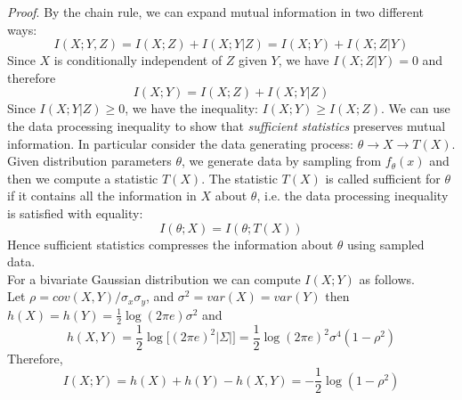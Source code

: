 \textit{Proof}. By the chain rule, we can expand mutual information in two different ways:
\begin{equation}
    I(X;Y,Z) = I(X;Z) + I(X;Y|Z) = I(X;Y) + I(X;Z|Y)
\end{equation}
Since $X$ is conditionally independent of $Z$ given $Y$, we have $I(X;Z|Y) = 0$ and therefore
\begin{equation}
    I(X;Y) = I(X;Z) + I(X;Y|Z)
\end{equation}
Since $I(X;Y|Z) \geq 0$, we have the inequality: $I(X;Y)\geq I(X;Z)$.
We can use the data processing inequality to show that \textit{sufficient statistics} preserves mutual information. In particular consider the data generating process: $\theta \rightarrow X \rightarrow T(X)$. Given distribution parameters $\theta$, we generate data by sampling from $f_{\theta}(x)$ and then we compute a statistic $T(X)$. The statistic $T(X)$ is called sufficient for $\theta$ if it contains all the information in $X$ about $\theta$, i.e. the data processing inequality is satisfied with equality:
\begin{equation}
    I(\theta; X) = I(\theta; T(X))
\end{equation}
Hence sufficient statistics compresses the information about $\theta$ using sampled data.\\

For a bivariate Gaussian distribution we can compute $I(X;Y)$ as follows.\\
Let $\rho = cov(X,Y)/\sigma_x \sigma_y$, and $\sigma^2 = var(X) = var(Y)$ then $h(X) = h(Y) = \frac{1}{2}\log(2\pi e)\sigma^2$ and
\begin{equation}
    h(X,Y) = \frac{1}{2}\log\big[(2\pi e)^{2}|\Sigma|\big] = \frac{1}{2}\log(2\pi e)^{2}\sigma^4(1-\rho^2)
\end{equation}
Therefore,
\begin{equation}
    I(X;Y) = h(X) + h(Y) - h(X,Y) = -\frac{1}{2}\log (1- \rho^2)
\end{equation}














